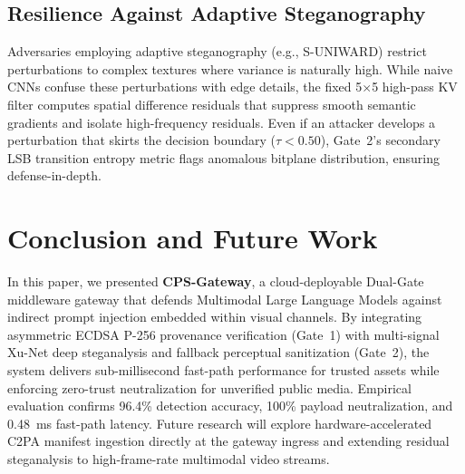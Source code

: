\documentclass[conference]{IEEEtran}
\begin{document}
\subsection{Resilience Against Adaptive Steganography}
Adversaries employing adaptive steganography (e.g., S-UNIWARD) restrict perturbations to complex textures where variance is naturally high. While naive CNNs confuse these perturbations with edge details, the fixed 5$\times$5 high-pass KV filter computes spatial difference residuals that suppress smooth semantic gradients and isolate high-frequency residuals. Even if an attacker develops a perturbation that skirts the decision boundary ($\tau < 0.50$), Gate~2's secondary LSB transition entropy metric flags anomalous bitplane distribution, ensuring defense-in-depth.

\section{Conclusion and Future Work}
\label{sec:conclusion}

In this paper, we presented \textbf{CPS-Gateway}, a cloud-deployable Dual-Gate middleware gateway that defends Multimodal Large Language Models against indirect prompt injection embedded within visual channels. By integrating asymmetric ECDSA P-256 provenance verification (Gate~1) with multi-signal Xu-Net deep steganalysis and fallback perceptual sanitization (Gate~2), the system delivers sub-millisecond fast-path performance for trusted assets while enforcing zero-trust neutralization for unverified public media. Empirical evaluation confirms 96.4\% detection accuracy, 100\% payload neutralization, and 0.48~ms fast-path latency. Future research will explore hardware-accelerated C2PA manifest ingestion directly at the gateway ingress and extending residual steganalysis to high-frame-rate multimodal video streams.



\end{document}
